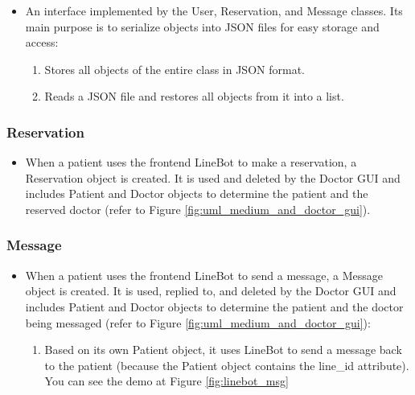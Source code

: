 \documentclass{article}
\begin{document}
\begin{itemize}
    \item An interface implemented by the User, Reservation, and Message classes. Its main purpose is to serialize objects into JSON files for easy storage and access:
    \begin{enumerate}[label=(\roman*)]
        \item {} Stores all objects of the entire class in JSON format.
        \item {} Reads a JSON file and restores all objects from it into a list.
    \end{enumerate}
\end{itemize}

\subsubsection*{Reservation}

\begin{itemize}
    \item When a patient uses the frontend LineBot to make a reservation, a Reservation object is created. It is used and deleted by the Doctor GUI and includes Patient and Doctor objects to determine the patient and the reserved doctor (refer to Figure \ref{fig:uml_medium_and_doctor_gui}).
\end{itemize}

\subsubsection*{Message}

\begin{itemize}
    \item When a patient uses the frontend LineBot to send a message, a Message object is created. It is used, replied to, and deleted by the Doctor GUI and includes Patient and Doctor objects to determine the patient and the doctor being messaged (refer to Figure \ref{fig:uml_medium_and_doctor_gui}):
    \begin{enumerate}[label=(\roman*)]
        \item {} Based on its own Patient object, it uses LineBot to send a message back to the patient (because the Patient object contains the line\_id attribute). You can see the demo at Figure \ref{fig:linebot_msg}
    \end{enumerate}
\end{itemize}
\end{document}
